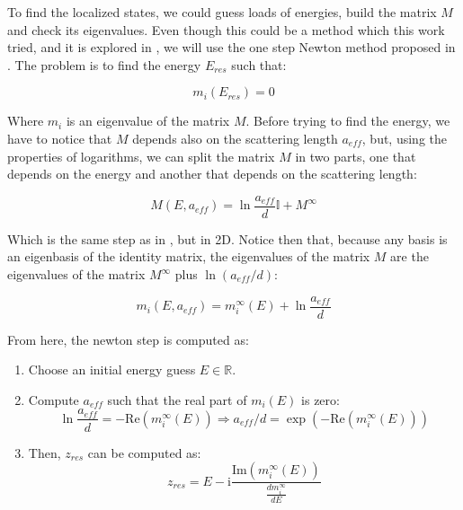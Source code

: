 To find the localized states, we could guess loads of energies, build the matrix $M$ and check its eigenvalues. Even though this could be a method which this work tried, and it is explored in \cite{massignanThreedimensional2006}, we will use the one step Newton method proposed in \cite{antezzaQuantitativeStudyTwo2010}. The problem is to find the energy $E_{res}$ such that:

\begin{equation}
    m_i(E_{res})=0
\end{equation}

Where $m_i$ is an eigenvalue of the matrix $M$. Before trying to find the energy, we have to notice that $M$ depends also on the scattering length $a_{eff}$, but, using the properties of logarithms, we can split the matrix $M$ in two parts, one that depends on the energy and another that depends on the scattering length:

\begin{equation}
    M(E,a_{eff})=\ln\frac{a_{eff}}{d}\mathbb I + M^{\infty}
\end{equation}

Which is the same step as in \cite{massignanThreedimensional2006}, but in 2D. Notice then that, because any basis is an eigenbasis of the identity matrix, the eigenvalues of the matrix $M$ are the eigenvalues of the matrix $M^{\infty}$ plus $\ln(a_{eff}/d)$:

\begin{equation}
    m_i(E,a_{eff})=m_i^{\infty}(E)+\ln\frac{a_{eff}}{d}
\end{equation}

From here, the newton step is computed as:

\begin{enumerate}
    \item Choose an initial energy guess $E\in \mathbb R$.
    \item Compute $a_{eff}$ such that the real part of $m_i(E)$ is zero:
    \begin {equation}
        \ln \frac{a_{eff}}{d}=-\text{Re}(m_i^{\infty}(E))\Rightarrow a_{eff}/d=\exp(-\text{Re}(m_i^{\infty}(E)))
    \end{equation}
    \item Then, $z_{res}$ can be computed as:
    \begin{equation}
        z_{res}=E-\text{i}\frac{\text{Im}(m_i^{\infty}(E))}{\frac{d m_i^{\infty}}{dE}}
    \end{equation}
\end{enumerate}

